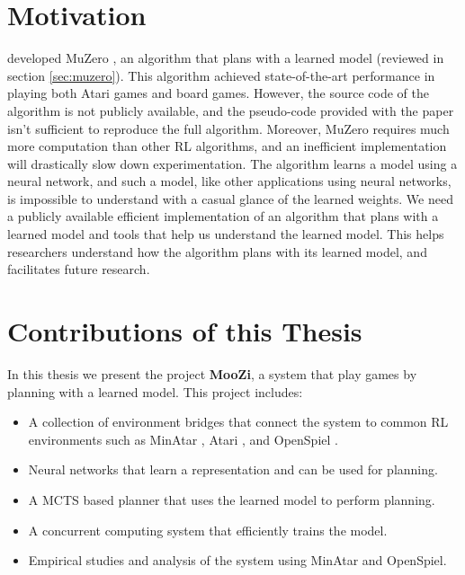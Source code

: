 \section{Motivation}
\citeauthor{MasteringAtariGo_Schrittwieser.Antonoglou.ea_2020} developed MuZero \cite{MasteringAtariGo_Schrittwieser.Antonoglou.ea_2020}, an algorithm that plans with a learned model (reviewed in section \ref{sec:muzero}).
This algorithm achieved state-of-the-art performance in playing both Atari games and board games.
However, the source code of the algorithm is not publicly available, and the pseudo-code provided with the paper isn't sufficient to reproduce the full algorithm.
Moreover, MuZero requires much more computation than other RL algorithms, and an inefficient implementation will drastically slow down experimentation.
The algorithm learns a model using a neural network, and such a model, like other applications using neural networks, is impossible to understand with a casual glance of the learned weights.
We need a publicly available efficient implementation of an algorithm that plans with a learned model and tools that help us understand the learned model.
This helps researchers understand how the algorithm plans with its learned model, and facilitates future research.

\section{Contributions of this Thesis}
In this thesis we present the project \textbf{MooZi}, a system that play games by planning with a learned model.
This project includes:
\begin{itemize}
    \item A collection of environment bridges that connect the system to common RL environments such as MinAtar \cite{MasteringAtariGames_Ye.Liu.ea_2021}, Atari \cite{ArcadeLearningEnvironment_Bellemare.Naddaf.ea_2013a}, and OpenSpiel \cite{OpenSpielFrameworkReinforcement_Lanctot.Lockhart.ea_2020}.
    \item Neural networks that learn a representation and can be used for planning.
    \item A MCTS based planner that uses the learned model to perform planning.
    \item A concurrent computing system that efficiently trains the model.
    \item Empirical studies and analysis of the system using MinAtar and OpenSpiel.
\end{itemize}
